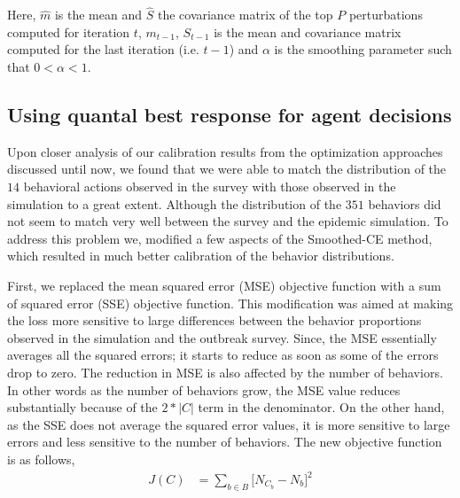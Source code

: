\documentclass[doublespace]{VTthesis}
\begin{document}
    Here, $\hat{m}$ is the mean and $\hat{S}$ the covariance matrix of the top $P$ perturbations computed for iteration $t$, $m_{t-1}$, $S_{t-1}$ is the mean and covariance matrix computed for the last iteration (i.e. $t-1$) and $\alpha$ is the smoothing parameter such that $0 < \alpha < 1$. 
    
    \subsection{Using quantal best response for agent decisions}
    Upon closer analysis of our calibration results from the optimization approaches discussed until now, we found that we were able to match the distribution of the $14$ behavioral actions observed in the survey with those observed in the simulation to a great extent. Although the distribution of the $351$ behaviors did not seem to match very well between the survey and the epidemic simulation. To address this problem we, modified a few aspects of the Smoothed-CE method, which resulted in much better calibration of the behavior distributions.
    
    First, we replaced the mean squared error (MSE) objective function with a sum of squared error (SSE) objective function. This modification was aimed at making the loss more sensitive to large differences between the behavior proportions observed in the simulation and the outbreak survey. Since, the MSE essentially averages all the squared errors; it starts to reduce as soon as some of the errors drop to zero. The reduction in MSE is also affected by the number of behaviors. In other words as the number of behaviors grow, the MSE value reduces substantially because of the $2 * |C|$ term in the denominator. On the other hand, as the SSE does not average the squared error values, it is more sensitive to large errors and less sensitive to the number of behaviors. The new objective function is as follows,
    \begin{align}
        J(C) &= \sum_{b \in B}\bigg[ N_{C_b} - N_{b} \bigg]^2
    	\label{eqn:objfn3}
    \end{align}
    
\end{document}
